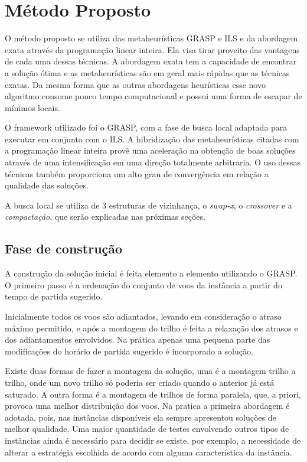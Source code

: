   \chapter{Método Proposto}
  
  O método proposto se utiliza das metaheurísticas GRASP e ILS e da abordagem exata através da programação linear inteira. Ela visa tirar proveito das vantagens de cada uma dessas técnicas. A abordagem exata tem a capacidade de encontrar a solução ótima e as metaheurísticas são em geral mais rápidas que as técnicas exatas. Da mesma forma que as outras abordagens heurísticas esse novo algoritmo consome pouco tempo computacional e possui uma forma de escapar de mínimos locais.
  
  O framework utilizado foi o GRASP, com a fase de busca local adaptada para executar em conjunto com o ILS. A hibridização das metaheurísticas citadas com a programação linear inteira provê uma aceleração na obtenção de boas soluções através de uma intensificação em uma direção totalmente arbitraria. O uso dessas técnicas também proporciona um alto grau de convergência em relação a qualidade das soluções.

  A busca local se utiliza de 3 estruturas de vizinhança, o \textit{swap-x}, o \textit{crossover} e a \textit{compactação}, que serão explicadas nas próximas seções.
  
\section{Fase de construção}
  
  A construção da solução inicial é feita elemento a elemento utilizando o GRASP. O primeiro passo é a ordenação do conjunto de voos da instância a partir do tempo de partida sugerido.  
  
  Inicialmente todos os voos são adiantados, levando em consideração o atraso máximo permitido, e após a montagem do trilho é feita a relaxação dos atrasos e dos adiantamentos envolvidos. Na prática apenas uma pequena parte das modificações do horário de partida sugerido é incorporado a solução.
  
  Existe duas formas de fazer a montagem da solução, uma é a montagem trilho a trilho, onde um novo trilho só poderia ser criado quando o anterior já está saturado. A outra forma é a montagem de trilhos de forma paralela, que, a priori, provoca uma melhor distribuição dos voos. Na pratica a primeira abordagem é adotada, pois, nas instâncias disponíveis ela sempre apresentou soluções de melhor qualidade. Uma maior quantidade de testes envolvendo outros tipos de instâncias ainda é necessário para decidir se existe, por exemplo, a necessidade de alterar a estratégia escolhida de acordo com alguma característica da instância.
  
